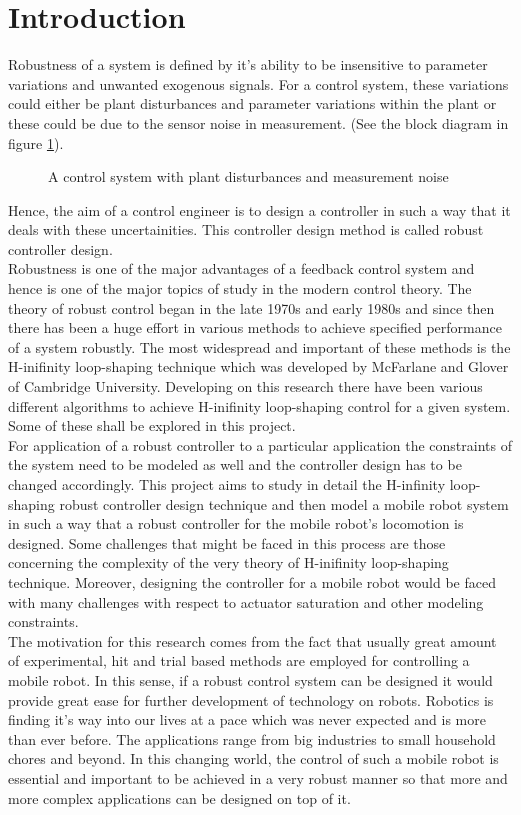 \documentclass[a4paper,12pt]{article}
\begin{document}
\section{Introduction}
Robustness of a system is defined by it's ability to be insensitive to parameter variations and unwanted exogenous signals. For a control system, these variations could either be plant disturbances and parameter variations within the plant or these could be due to the sensor noise in measurement. (See the block diagram in figure \ref{simple}).
		\begin{figure}[H]
 
			  \centering
			  
%			  
			  \def\svgscale{0.3}
			  \tiny{
			  
			  }
			  \caption{A control system with plant disturbances and measurement noise}
			 \label{simple}
		\end{figure} Hence, the aim of a control engineer is to design a controller in such a way that it deals with these uncertainities. This controller design method is called robust controller design. \\
Robustness is one of the major advantages of a feedback control system and hence is one of the major topics of study in the modern control theory. The theory of robust control began in the late 1970s and early 1980s and since then there has been a huge effort in various methods to achieve specified performance of a system robustly. The most widespread and important of these methods is the H-inifinity loop-shaping technique which was developed by McFarlane and Glover of Cambridge University. Developing on this research there have been various different algorithms to achieve H-inifinity loop-shaping control for a given system. Some of these shall be explored in this project. \\
For application of a robust controller to a particular application the constraints of the system need to be modeled as well and the controller design has to be changed accordingly. This project aims to study in detail the H-infinity loop-shaping robust controller design technique and then model a mobile robot system in such a way that a robust controller for the mobile robot's locomotion is designed. Some challenges that might be faced in this process are those concerning the complexity of the very theory of  H-inifinity loop-shaping technique. Moreover, designing the controller for a mobile robot would be faced with many challenges with respect to actuator saturation and other modeling constraints.\\
The motivation for this research comes from the fact that usually great amount of experimental, hit and trial based methods are employed for controlling a mobile robot. In this sense, if a robust control system can be designed it would provide great ease for further development of technology on robots. Robotics is finding it's way into our lives at a pace which was never expected and is more than ever before. The applications range from big industries to small household chores and beyond. In this changing world, the control of such a mobile robot is essential and important to be achieved in a very robust manner so that more and more complex applications can be designed on top of it.
\end{document}
